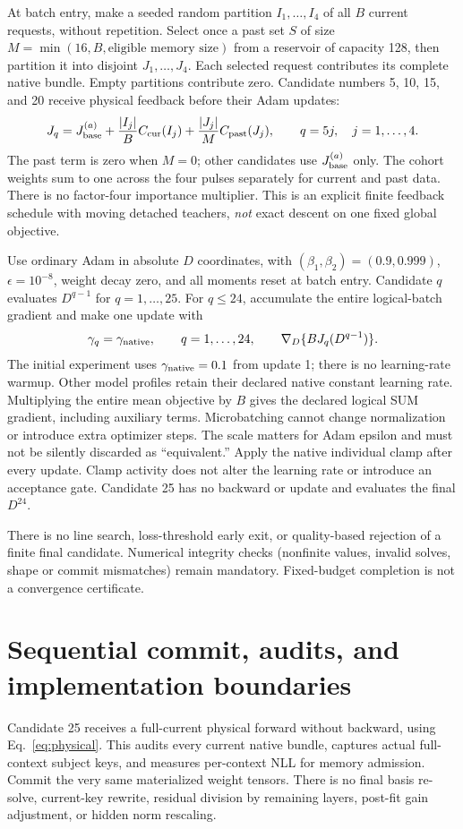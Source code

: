 \documentclass[10pt]{article}
\begin{document}
At batch entry, make a seeded random partition $I_1,\ldots,I_4$ of
all $B$ current requests, without repetition. Select once a past set
$S$ of size $M=\min(16,B,\text{eligible memory size})$ from a reservoir
of capacity 128, then partition it into disjoint $J_1,\ldots,J_4$.
Each selected request contributes its complete native bundle. Empty
partitions contribute zero. Candidate numbers 5, 10, 15, and 20 receive
physical feedback before their Adam updates:
\[
 J_q=J_{\rm base}^{(a)}+
 \frac{|I_j|}{B}C_{\rm cur}(I_j)
 +\frac{|J_j|}{M}C_{\rm past}(J_j),
 \qquad q=5j,\quad j=1,\ldots,4.
 \label{eq:pulse}
\]
The past term is zero when $M=0$; other candidates use $J_{\rm base}^{(a)}$
only. The cohort weights sum to one across the four pulses separately
for current and past data. There is no factor-four importance multiplier.
This is an explicit finite feedback schedule with moving detached
teachers, \emph{not} exact descent on one fixed global objective.

Use ordinary Adam in absolute $D$ coordinates, with
$(\beta_1,\beta_2)=(0.9,0.999)$, $\epsilon=10^{-8}$, weight decay zero,
and all moments reset at batch entry. Candidate $q$ evaluates $D^{q-1}$ for $q=1,\ldots,25$.
For $q\leq24$, accumulate the entire logical-batch gradient and make one
update with
\[
 \gamma_q=\gamma_{\rm native},\qquad q=1,\ldots,24,\qquad
 \nabla_D\{B J_q(D^{q-1})\}.
\]
The initial experiment uses $\gamma_{\rm native}=0.1$ from update 1;
there is no learning-rate warmup. Other model profiles retain their
declared native constant learning rate.
Multiplying the entire mean objective by $B$ gives the declared logical
SUM gradient, including auxiliary terms. Microbatching cannot change
normalization or introduce extra optimizer steps. The scale matters
for Adam epsilon and must not be silently discarded as ``equivalent.''
Apply the native individual clamp after every update. Clamp activity does
not alter the learning rate or introduce an acceptance gate. Candidate 25
has no backward or update and evaluates the final $D^{24}$.

There is no line search, loss-threshold early exit, or quality-based
rejection of a finite final candidate. Numerical integrity checks
(nonfinite values, invalid solves, shape or commit mismatches) remain
mandatory. Fixed-budget completion is not a convergence certificate.

\newpage
\section{Sequential commit, audits, and implementation boundaries}
Candidate 25 receives a full-current physical forward without backward,
using Eq.~\eqref{eq:physical}. This audits every current native bundle,
captures actual full-context subject keys, and measures per-context NLL
for memory admission. Commit the very same materialized weight tensors.
There is no final basis re-solve, current-key rewrite, residual division
by remaining layers, post-fit gain adjustment, or hidden norm rescaling.
\end{document}
